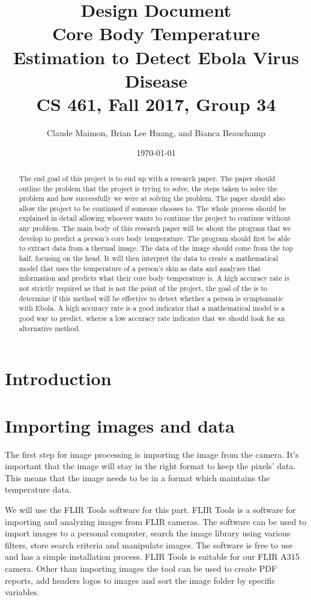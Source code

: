\documentclass[onecolumn, draftclsnofoot,10pt, compsoc]{IEEEtran}
\title{%
  Design Document \\
  \vspace{0.4cm}
  \large Core Body Temperature Estimation to Detect Ebola Virus Disease \\
  \vspace{0.4cm}
  \large CS 461, Fall 2017, Group 34\\
    }
\author{Claude Maimon, Brian Lee Huang, and Bianca Beauchamp}
\date{\today}
\begin{document}
\maketitle

\begin{abstract}
	The end goal of this project is to end up with a research paper. The paper should outline the problem that the project is trying to solve, the steps taken to solve the problem and how successfully we were
	at solving the problem. The paper should also allow the project to be continued if someone chooses to. The whole process should be explained in detail allowing whoever wants to continue the
	project to continue without any problem. The main body of this research paper will be about the program that we develop to predict a person's core body temperature. The program should first be able to
	extract data from a thermal image. The data of the image should come from the top half, focusing on the head. It will then interpret the data to create a mathematical model that uses the temperature of a 
	person's skin as data and analyzes that information and predicts what their core body temperature is. A high accuracy rate is not strictly required as that is not the point of the project, 
	the goal of the is to determine if this method will be effective to detect whether a person is symptomatic with Ebola. A high accuracy rate is a good indicator that a mathematical model
	is a good way to predict, wherse a low accuracy rate indicates that we should look for an alternative method.
\end{abstract}

\newpage

\tableofcontents
\newpage
\section{Introduction}
\section{Importing images and data}
The first step for image processing is importing the image from the camera. It’s important that the image will stay in the right format to keep the pixels’ data.  This means that the image needs to be in a format which maintains the temperature data.  

We will use the FLIR Tools software for this part. FLIR Tools is a software for importing and analyzing images from FLIR cameras. The software can be used to import images to a personal computer, search the image library using various filters, store search criteria and manipulate images. The software is free to use and has a simple installation process. FLIR Tools is suitable for our FLIR A315 camera. Other than importing images the tool can be used to create PDF reports, add headers logos to images and sort the image folder by specific variables.\cite{ClaudeTech}
\end{document}
